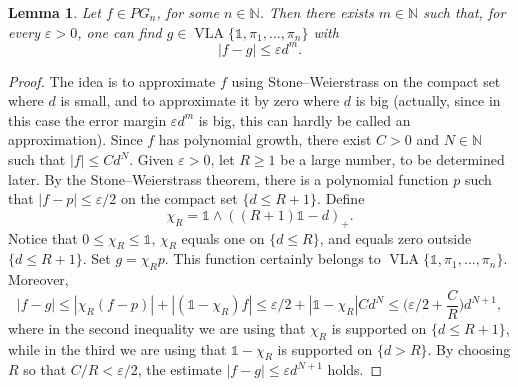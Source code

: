 \documentclass{amsart}
\theoremstyle{plain}
\newtheorem{lem}[thm]{Lemma}
\theoremstyle{definition}
\theoremstyle{remark}
\newcommand\N{\ensuremath{\mathbb{N}}}
\newcommand{\one}{\mathbb{1}}
\newcommand{\VLA}{\operatorname{VLA}}
\begin{document}
\begin{lem}\label{lem:prelim4}
    Let $f \in PG_n$, for some $n \in \N$. Then there exists $m \in
    \N$ such that, for every $\varepsilon >0$, one can find $g \in
    \VLA\{\one,\pi _1,\ldots ,\pi _n\}$ with
    \[
    |f-g|\le \varepsilon d^{m}.
    \]
\end{lem}
\begin{proof}
    The idea is to approximate $f$ using
    Stone--Weierstrass on the compact set where $d$ is small, and to
    approximate it by zero where $d$ is big (actually, since in this
    case the error margin $\varepsilon d^{m}$ is big, this can hardly be
    called an approximation). Since $f$ has polynomial growth, there exist $C>0$ and
    $N \in \N$ such that $|f|\le C d^{N}$.  Given $\varepsilon >0$,
    let $R\ge 1$ be a large number, to be determined later. By the
    Stone--Weierstrass theorem, there is a polynomial function $p$
    such that $|f-p|\le \varepsilon/2$ on the compact set $\{d\le
    R+1\}$. Define
    \[
    \chi _R=\one \wedge ( (R+1)\one - d)_+.
    \]
    Notice that $0\le \chi _R\le \one$, $\chi _R$ equals one
    on $\{d\le R\}$, and equals zero outside $\{d\le R+1\}$. Set $g=\chi _Rp$. This function certainly belongs
    to $\VLA\{\one, \pi _1,\ldots ,\pi _n\}$. Moreover,
    \[
    |f-g|\le |\chi _R(f-p)|+|(\one-\chi _R)f|\le \varepsilon
    /2+|\one-\chi _R|Cd^{N}\le \bigg(\varepsilon /2+\frac{C}{R}\bigg)d^{N+1},
    \]
    where in the second inequality we are using that $\chi _R$ is
    supported on $\{d\le R+1\}$, while in the third we are using that $\one-\chi _R$ is supported on
    $\{d>R\}$. By choosing $R$ so that $C/R<\varepsilon /2$, the
    estimate $|f-g|\le \varepsilon d^{N+1}$ holds.
\end{proof}
\end{document}
